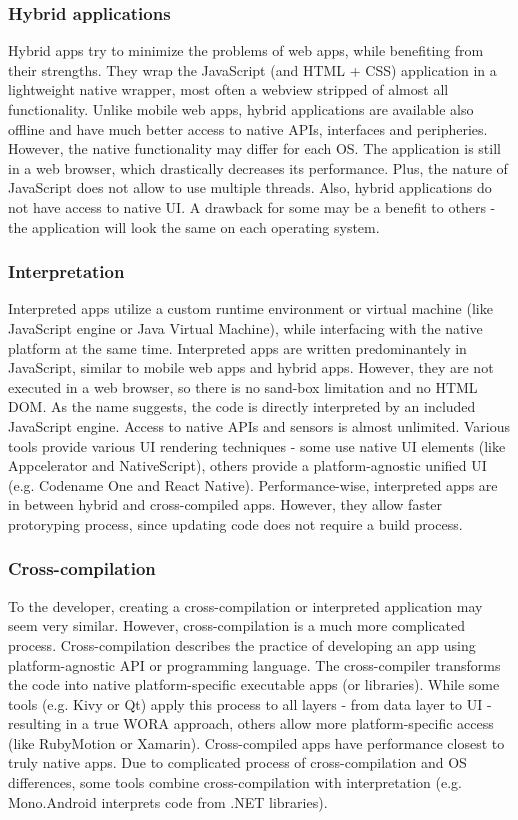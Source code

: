 \documentclass[english,master,public,dept460,male,cpdeclaration,oneside]{diploma}
\begin{document}
\subsubsection{Hybrid applications}
Hybrid apps try to minimize the problems of web apps, while benefiting from their strengths. They wrap the JavaScript (and HTML + CSS) application in a lightweight native wrapper, most often a webview stripped of almost all functionality. Unlike mobile web apps, hybrid applications are available also offline and have much better access to native APIs, interfaces and peripheries. However, the native functionality may differ for each OS. The application is still in a web browser, which drastically decreases its performance. Plus, the nature of JavaScript does not allow to use multiple threads. Also, hybrid applications do not have access to native UI. A drawback for some may be a benefit to others - the application will look the same on each operating system. 

\subsubsection{Interpretation}
Interpreted apps utilize a custom runtime environment or virtual machine (like JavaScript engine or Java Virtual Machine), while interfacing with the native platform at the same time. Interpreted apps are written predominantely in JavaScript, similar to mobile web apps and hybrid apps. However, they are not executed in a web browser, so there is no sand-box limitation and no HTML DOM. As the name suggests, the code is directly interpreted by an included JavaScript engine. Access to native APIs and sensors is almost unlimited. Various tools provide various UI rendering techniques - some use native UI elements (like Appcelerator and NativeScript), others provide a platform-agnostic unified UI (e.g. Codename One and React Native). Performance-wise, interpreted apps are in between hybrid and cross-compiled apps. However, they allow faster protoryping process, since updating code does not require a build process.

\subsubsection{Cross-compilation}
To the developer, creating a cross-compilation or interpreted application may seem very similar. However, cross-compilation is a much more complicated process. 
Cross-compilation describes the practice of developing an app using platform-agnostic API or programming language. The cross-compiler transforms the code into native platform-specific executable apps (or libraries). While some tools (e.g. Kivy or Qt) apply this process to all layers - from data layer to UI - resulting in a true WORA approach, others allow more platform-specific access (like RubyMotion or Xamarin). Cross-compiled apps have performance closest to truly native apps. Due to complicated process of cross-compilation and OS differences, some tools combine cross-compilation with interpretation (e.g. Mono.Android interprets code from .NET libraries).
\end{document}
